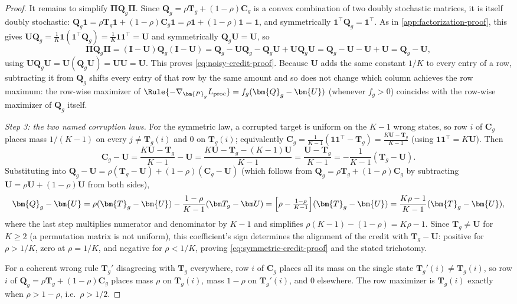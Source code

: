 \begin{proof}
It remains to simplify $\bm\Pi\bm Q_g\bm\Pi$. Since
$\bm{Q}_g=\rho \bm{T}_g+(1-\rho)\bm{C}_g$ is a convex combination of two doubly
stochastic matrices, it is itself doubly stochastic:
$\bm Q_g\mathbf1=\rho\bm T_g\mathbf1+(1-\rho)\bm C_g\mathbf1=\rho\mathbf1+(1-\rho)\mathbf1=\mathbf1$,
and symmetrically $\mathbf1^\top\bm Q_g=\mathbf1^\top$. As in
\cref{app:factorization-proof}, this gives
$\bm U\bm Q_g=\tfrac1K\mathbf1(\mathbf1^\top\bm Q_g)=\tfrac1K\mathbf1\mathbf1^\top=\bm U$
and symmetrically $\bm Q_g\bm U=\bm U$, so
\[
 \bm{\Pi} \bm{Q}_g\bm{\Pi}
 =(\bm I-\bm U)\bm Q_g(\bm I-\bm U)
 =\bm{Q}_g-\bm{U}\bm{Q}_g-\bm{Q}_g\bm{U}+\bm{U}\bm{Q}_g\bm{U}
 =\bm{Q}_g-\bm{U}-\bm U+\bm U=\bm{Q}_g-\bm{U},
\]
using $\bm U\bm Q_g\bm U=\bm U(\bm Q_g\bm U)=\bm U\bm U=\bm U$. This proves
\cref{eq:noisy-credit-proof}. Because $\bm U$ adds the same constant $1/K$
to every entry of a row, subtracting it from $\bm Q_g$ shifts every entry of
that row by the same amount and so does not change which column achieves
the row maximum: the row-wise maximizer of
$\Rule{-\nabla_{\bm{P}_g}L_{\rm proc}}=f_g(\bm{Q}_g-\bm{U})$ (whenever $f_g>0$)
coincides with the row-wise maximizer of $\bm Q_g$ itself.

\emph{Step 3: the two named corruption laws.} For the symmetric law, a
corrupted target is uniform on the $K-1$ wrong states, so row $i$ of
$\bm C_g$ places mass $1/(K-1)$ on every $j\ne\bm T_g(i)$ and $0$ on
$\bm T_g(i)$; equivalently
$\bm{C}_g=\frac{1}{K-1}(\mathbf1\mathbf1^\top-\bm{T}_g)=\frac{K\bm U-\bm{T}_g}{K-1}$
(using $\mathbf1\mathbf1^\top=K\bm U$). Then
\[
 \bm{C}_g-\bm{U}
 =\frac{K\bm U-\bm{T}_g}{K-1}-\bm U
 =\frac{K\bm U-\bm{T}_g-(K-1)\bm{U}}{K-1}
 =\frac{\bm U-\bm T_g}{K-1}
 =-\frac{1}{K-1}(\bm{T}_g-\bm{U}).
\]
Substituting into $\bm Q_g-\bm U=\rho(\bm T_g-\bm U)+(1-\rho)(\bm C_g-\bm U)$
(which follows from $\bm Q_g=\rho\bm T_g+(1-\rho)\bm C_g$ by subtracting
$\bm U=\rho\bm U+(1-\rho)\bm U$ from both sides),
\[
 \bm{Q}_g-\bm{U}
 =\rho(\bm{T}_g-\bm{U})-\frac{1-\rho}{K-1}(\bm T_g-\bm U)
 =\Bigl[\rho-\tfrac{1-\rho}{K-1}\Bigr](\bm{T}_g-\bm{U})
 =\frac{K\rho-1}{K-1}(\bm{T}_g-\bm{U}),
\]
where the last step multiplies numerator and denominator by $K-1$ and
simplifies $\rho(K-1)-(1-\rho)=K\rho-1$. Since $\bm T_g\ne\bm U$ for
$K\ge2$ (a permutation matrix is not uniform), this coefficient's sign
determines the alignment of the credit with $\bm T_g-\bm U$: positive for
$\rho>1/K$, zero at $\rho=1/K$, and negative for $\rho<1/K$, proving
\cref{eq:symmetric-credit-proof} and the stated trichotomy.

For a coherent wrong rule $\bm{T}_g'$ disagreeing with $\bm T_g$ everywhere,
row $i$ of $\bm C_g$ places all its mass on the single state
$\bm T_g'(i)\ne\bm T_g(i)$, so row $i$ of
$\bm Q_g=\rho\bm T_g+(1-\rho)\bm C_g$ places mass $\rho$ on $\bm T_g(i)$,
mass $1-\rho$ on $\bm T_g'(i)$, and $0$ elsewhere. The row maximizer is
$\bm{T}_g(i)$ exactly when $\rho>1-\rho$, i.e.\ $\rho>1/2$.
\end{proof}

